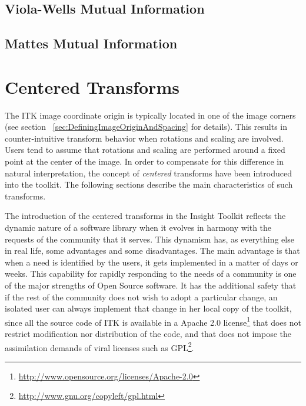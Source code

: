 \subsection{Viola-Wells Mutual Information}
\label{sec:MultiModalityRegistrationViolaWells}
\ifitkFullVersion

\fi

\subsection{Mattes Mutual Information}
\label{sec:MultiModalityRegistrationMattes}
\ifitkFullVersion

\fi

% 


\section{ Centered Transforms }

The ITK image coordinate origin is typically located in one of the image
corners (see section ~\ref{sec:DefiningImageOriginAndSpacing} for details).
This results in counter-intuitive transform behavior when rotations and scaling
are involved. Users tend to assume that rotations and scaling are performed
around a fixed point at the center of the image.  In order to compensate for
this difference in natural interpretation, the concept of \emph{centered}
transforms have been introduced into the toolkit. The following sections
describe the main characteristics of such transforms.

The introduction of the centered transforms in the Insight Toolkit reflects the
dynamic nature of a software library when it evolves in harmony with the
requests of the community that it serves. This dynamism has, as everything else
in real life, some advantages and some disadvantages. The main advantage is that
when a need is identified by the users, it gets implemented in a matter of days
or weeks.  This capability for rapidly responding to the needs of a community
is one of the major strengths of Open Source software. It has the additional
safety that if the rest of the community does not wish to adopt a particular
change, an isolated user can always implement that change in her local copy of
the toolkit, since all the source code of ITK is available in a Apache 2.0
license\footnote{\url{http://www.opensource.org/licenses/Apache-2.0}} that
does not restrict modification nor distribution of the code, and that does not
impose the assimilation demands of viral licenses such as
GPL\footnote{\url{http://www.gnu.org/copyleft/gpl.html}}.

